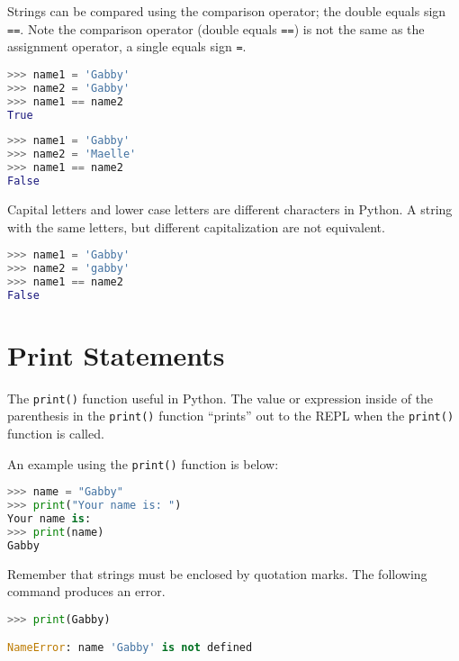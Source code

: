 \documentclass{book}
\newcommand{\passthrough}[1]{#1}
\begin{document}
    
        Strings can be compared using the comparison operator; the double equals
sign \passthrough{\lstinline!==!}. Note the comparison operator (double
equals \passthrough{\lstinline!==!}) is not the same as the assignment
operator, a single equals sign \passthrough{\lstinline!=!}.

\begin{lstlisting}[language=Python]
>>> name1 = 'Gabby'
>>> name2 = 'Gabby'
>>> name1 == name2
True
\end{lstlisting}

\begin{lstlisting}[language=Python]
>>> name1 = 'Gabby'
>>> name2 = 'Maelle'
>>> name1 == name2
False
\end{lstlisting}

Capital letters and lower case letters are different characters in
Python. A string with the same letters, but different capitalization are
not equivalent.

\begin{lstlisting}[language=Python]
>>> name1 = 'Gabby'
>>> name2 = 'gabby'
>>> name1 == name2
False
\end{lstlisting}
    




    
        \hypertarget{print-statements}{%
\section{Print Statements}\label{print-statements}}
    




    
        The \passthrough{\lstinline!print()!} function useful in Python. The
value or expression inside of the parenthesis in the
\passthrough{\lstinline!print()!} function ``prints'' out to the REPL
when the \passthrough{\lstinline!print()!} function is called.

An example using the \passthrough{\lstinline!print()!} function is
below:

\begin{lstlisting}[language=Python]
>>> name = "Gabby"
>>> print("Your name is: ")
Your name is: 
>>> print(name)
Gabby
\end{lstlisting}

Remember that strings must be enclosed by quotation marks. The following
command produces an error.

\begin{lstlisting}[language=Python]
>>> print(Gabby)

NameError: name 'Gabby' is not defined
\end{lstlisting}
\end{document}
